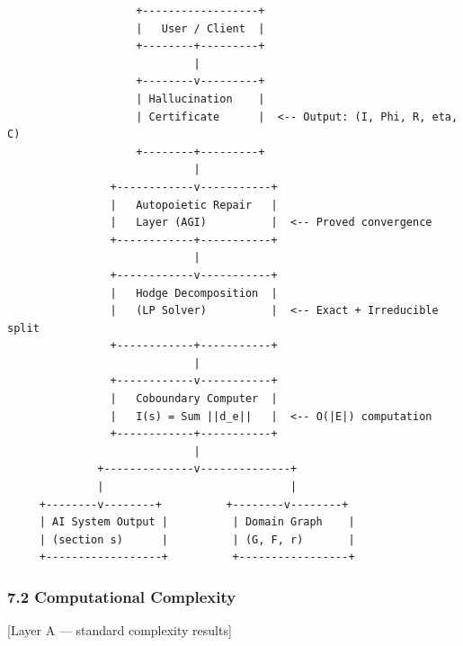 \documentclass[
]{article}
\begin{document}
\begin{verbatim}
                    +------------------+
                    |   User / Client  |
                    +--------+---------+
                             |
                    +--------v---------+
                    | Hallucination    |
                    | Certificate      |  <-- Output: (I, Phi, R, eta, C)
                    +--------+---------+
                             |
                +------------v-----------+
                |   Autopoietic Repair   |
                |   Layer (AGI)          |  <-- Proved convergence
                +------------+-----------+
                             |
                +------------v-----------+
                |   Hodge Decomposition  |
                |   (LP Solver)          |  <-- Exact + Irreducible split
                +------------+-----------+
                             |
                +------------v-----------+
                |   Coboundary Computer  |
                |   I(s) = Sum ||d_e||   |  <-- O(|E|) computation
                +------------+-----------+
                             |
              +--------------v--------------+
              |                             |
     +--------v--------+          +--------v--------+
     | AI System Output |          | Domain Graph    |
     | (section s)      |          | (G, F, r)       |
     +------------------+          +-----------------+
\end{verbatim}

\subsubsection{7.2 Computational
Complexity}\label{computational-complexity}

{[}Layer A --- standard complexity results{]}
\end{document}
